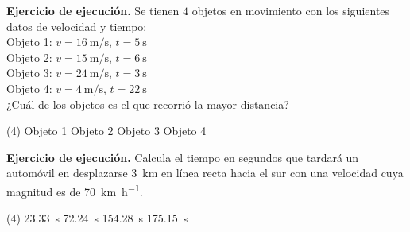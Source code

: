 \documentclass[12pt, letter]{exam}
\begin{document}
\begin{questions}
    \question \label{Ejercicio_02} \textbf{Ejercicio de ejecución. } Se tienen $4$ objetos en movimiento con los siguientes datos de velocidad y tiempo: \\[0.3em]
    Objeto 1: $v = \SI{16}{\meter\per\second}, \, t = \SI{5}{\second}$ \\[0.3em]
    Objeto 2: $v = \SI{15}{\meter\per\second}, \, t = \SI{6}{\second}$ \\[0.3em]
    Objeto 3: $v = \SI{24}{\meter\per\second}, \, t = \SI{3}{\second}$ \\[0.3em]
    Objeto 4: $v = \SI{4}{\meter\per\second}, \, t = \SI{22}{\second}$ \\[0.3em]
    ¿Cuál de los objetos es el que recorrió la mayor distancia? 
    \begin{tasks}(4)
        \task Objeto 1
        \task Objeto 2
        \task Objeto 3
        \task Objeto 4        
    \end{tasks}
    \question \label{Ejercicio_03} \textbf{Ejercicio de ejecución. } Calcula el tiempo en segundos que tardará un automóvil en desplazarse \SI{3}{\kilo\meter} en línea recta hacia el sur con una velocidad cuya magnitud es de \SI{70}{\kilo\meter\per\hour}.
    \begin{tasks}(4)
        \task \SI{23.33}{\second}
        \task \SI{72.24}{\second}
        \task \SI{154.28}{\second}
        \task \SI{175.15}{\second}
    \end{tasks}

\end{questions}
\end{document}
